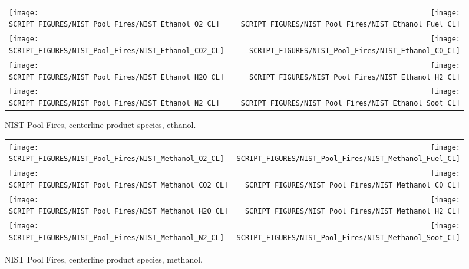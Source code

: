 \begin{figure}[p]
\begin{tabular*}{\textwidth}{l@{\extracolsep{\fill}}r}
\texttt{[image: SCRIPT\_FIGURES/NIST\_Pool\_Fires/NIST\_Ethanol\_O2\_CL]} &
\texttt{[image: SCRIPT\_FIGURES/NIST\_Pool\_Fires/NIST\_Ethanol\_Fuel\_CL]} \\
\texttt{[image: SCRIPT\_FIGURES/NIST\_Pool\_Fires/NIST\_Ethanol\_CO2\_CL]} &
\texttt{[image: SCRIPT\_FIGURES/NIST\_Pool\_Fires/NIST\_Ethanol\_CO\_CL]}    \\
\texttt{[image: SCRIPT\_FIGURES/NIST\_Pool\_Fires/NIST\_Ethanol\_H2O\_CL]} &
\texttt{[image: SCRIPT\_FIGURES/NIST\_Pool\_Fires/NIST\_Ethanol\_H2\_CL]} \\
\texttt{[image: SCRIPT\_FIGURES/NIST\_Pool\_Fires/NIST\_Ethanol\_N2\_CL]} &
\texttt{[image: SCRIPT\_FIGURES/NIST\_Pool\_Fires/NIST\_Ethanol\_Soot\_CL]}
\end{tabular*}
\caption[NIST Pool Fires, centerline product species, ethanol]{NIST Pool Fires, centerline product species, ethanol.}
\label{NIST_Pool_Fires_Ethanol}
\end{figure}

\begin{figure}[p]
\begin{tabular*}{\textwidth}{l@{\extracolsep{\fill}}r}
\texttt{[image: SCRIPT\_FIGURES/NIST\_Pool\_Fires/NIST\_Methanol\_O2\_CL]} &
\texttt{[image: SCRIPT\_FIGURES/NIST\_Pool\_Fires/NIST\_Methanol\_Fuel\_CL]} \\
\texttt{[image: SCRIPT\_FIGURES/NIST\_Pool\_Fires/NIST\_Methanol\_CO2\_CL]} &
\texttt{[image: SCRIPT\_FIGURES/NIST\_Pool\_Fires/NIST\_Methanol\_CO\_CL]}    \\
\texttt{[image: SCRIPT\_FIGURES/NIST\_Pool\_Fires/NIST\_Methanol\_H2O\_CL]} &
\texttt{[image: SCRIPT\_FIGURES/NIST\_Pool\_Fires/NIST\_Methanol\_H2\_CL]} \\
\texttt{[image: SCRIPT\_FIGURES/NIST\_Pool\_Fires/NIST\_Methanol\_N2\_CL]} &
\texttt{[image: SCRIPT\_FIGURES/NIST\_Pool\_Fires/NIST\_Methanol\_Soot\_CL]}
\end{tabular*}
\caption[NIST Pool Fires, centerline product species, methanol]{NIST Pool Fires, centerline product species, methanol.}
\label{NIST_Pool_Fires_Methanol}
\end{figure}

\clearpage

